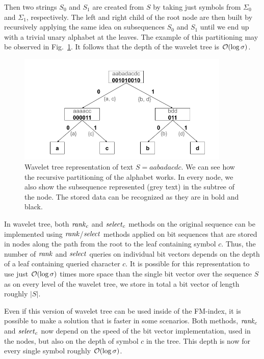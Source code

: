 Then two strings $S_0$ and $S_1$ are created from $S$ by taking just symbols
from $\Sigma_0$ and $\Sigma_1$, respectively. The left and right child of the root node
are then built by recursively applying the same idea on subsequences $S_0$ and $S_1$ until
we end up with a trivial unary alphabet at the leaves. The example of this partitioning may
be observed in Fig.~\ref{obr:WaveletTreeExample}. It follows that the depth of the wavelet
tree is $\mathcal{O}(\log \sigma)$.
\begin{figure}
	\centerline{
		\includegraphics[width=0.9\textwidth, height=0.3\textheight]{images/wavelet_tree}
	}
	\caption[TODO]{Wavelet tree representation of text $S=\mathit{aabadacdc}$. We can see how
	the recursive partitioning of the alphabet works. In every node, we also show the
	subsequence represented (grey text) in the subtree of the node. The stored data can be
	recognized as they are in bold and black.
	}
	\label{obr:WaveletTreeExample}
\end{figure}

In wavelet tree, both $\mathit{rank}_c$ and $\mathit{select}_c$ methods on the original sequence can
be implemented using $\mathit{rank}$/$\mathit{select}$ methods applied on bit sequences that are stored
in nodes along the path from the root to the leaf containing symbol $c$. Thus, the
number of $\mathit{rank}$ and $\mathit{select}$ queries on individual bit vectors depends on the depth of
a leaf containing queried character $c$. It is possible for this representation to use
just $\mathcal{O}(\log \sigma)$ times more space than the single bit vector over the sequence $S$
as on every level of the wavelet tree, we store in total a bit vector of length roughly $|S|$.

Even if this version of wavelet tree can be used inside of the FM-index, it is possible to
make a solution that is faster in some scenarios. Both methods, $\mathit{rank}_c$ and $\mathit{select}_c$ now
depend on the speed of the bit vector implementation, used in the nodes, but also on the depth
of symbol $c$ in the tree. This depth is now for every single symbol roughly $\mathcal{O}(\log \sigma)$.

